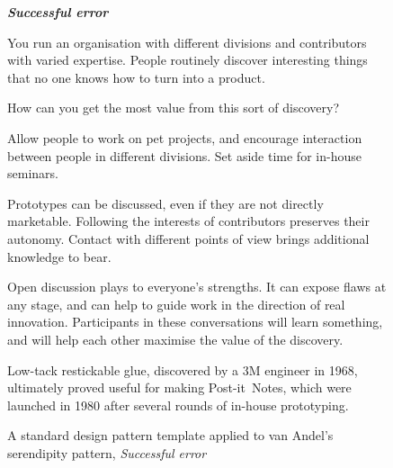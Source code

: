 \begin{figure}[!h]
{\normalsize
\begin{mdframed}
\vspace{2mm}
\textbf{\emph{Successful error}}~
\begin{description}[leftmargin=0\parindent,labelindent=0em,itemsep=10pt]
\item[{Context.}] You run an organisation with different divisions and
  contributors with varied expertise.  People routinely discover
  interesting things that no one knows how to turn into a product.
\item[{Problem.}]  How can you get the most value from this sort of discovery?
\item[{Solution.}] Allow people to work on pet projects, and encourage
  interaction between people in different divisions.  Set aside time
  for in-house seminars.
\item[{Rationale.}] Prototypes can be discussed, even if they are not
  directly marketable.  Following the interests of contributors
  preserves their autonomy.  Contact with different points of view
  brings additional knowledge to bear.
\item[{Resolution.}] 
Open discussion plays to everyone's strengths.  It can
  expose flaws at any stage, and can help to guide work in the direction of
  real innovation.  Participants in these conversations
  will learn something, and will help each other maximise the value of
  the discovery.  
\item[{Example.}] Low-tack restickable glue, discovered by a 3M
  engineer in 1968, ultimately proved useful for making
  Post-it\texttrademark\ Notes, which were launched in 1980 after
  several rounds of in-house prototyping.
\end{description}
\vspace{-1mm}
\end{mdframed}
}
\caption{A standard design pattern template applied to van Andel's serendipity pattern, \em{Successful error}\label{fig:va-pattern-figure}}
\end{figure}
